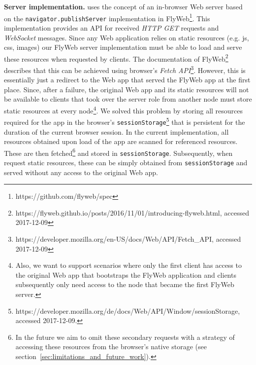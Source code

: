\noindent\textbf{Server implementation.}
\APIName uses the concept of an in-browser Web server based on the \texttt{navigator.publishServer} implementation in FlyWeb\footnote{https://github.com/flyweb/spec}.
This implementation provides an API for received \textit{HTTP GET} requests and \textit{WebSocket} messages.
Since any Web application relies on static resources (e.g. js, css, images) our FlyWeb server implementation must be able to load and serve these resources when requested by clients.
The documentation of FlyWeb\footnote{https://flyweb.github.io/posts/2016/11/01/introducing-flyweb.html, accessed 2017-12-09} describes that this can be achieved using browser's \textit{Fetch API}\footnote{https://developer.mozilla.org/en-US/docs/Web/API/Fetch\_API, accessed 2017-12-09}.
However, this is essentially just a redirect to the Web app that served the FlyWeb app at the first place.
Since, after a failure, the original Web app and its static resources will not be available to clients that took over the server role from another node \APIshort must store static resources at every node\footnote{Also, we want to support scenarios where only the first client has access to the original Web app that bootstraps the FlyWeb application and clients subsequently only need access to the node that became the first FlyWeb server.}.
We solved this problem by storing all resources required for the \APIshort app in the browser's \texttt{sessionStorage}\footnote{https://developer.mozilla.org/de/docs/Web/API/Window/sessionStorage, accessed 2017-12-09.} that is persistent for the duration of the current browser session.
In the current implementation, all resources obtained upon load of the app are scanned for referenced resources.
These are then fetched\footnote{In the future we aim to omit these secondary requests with a strategy of accessing these resources from the browser's native storage (see section~\ref{sec:limitations_and_future_work}).} and stored in \texttt{sessionStorage}.
Subsequently, when \APIshort request static resources, these can be simply obtained from \texttt{sessionStorage} and served without any access to the original Web app.



